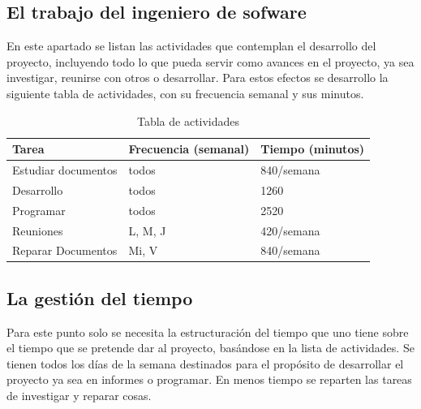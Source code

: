\documentclass[a4paper,12pt,openany,oneside]{book}
\begin{document}
\subsection{El trabajo del ingeniero de sofware}
En este apartado se listan las actividades que contemplan el desarrollo del proyecto, incluyendo todo lo que pueda servir como avances en el proyecto, ya sea investigar, reunirse con otros o desarrollar. Para estos efectos se desarrollo la siguiente tabla de actividades, con su frecuencia semanal y sus minutos.

\newpage
\begin{table}
\begin{tabular}{|l | l | l |}
\hline
\textbf{Tarea} & \textbf{Frecuencia (semanal)} & \textbf{Tiempo (minutos)} \\
\hline
Estudiar documentos & todos & 840/semana\\
\hline
Desarrollo & todos & 1260\\
\hline
Programar & todos & 2520\\
\hline
Reuniones & L, M, J & 420/semana\\
\hline
Reparar Documentos & Mi, V & 840/semana\\
\hline
\end{tabular}
\caption{Tabla de actividades}
\end{table}
\subsection{La gestión del tiempo}
Para este punto solo se necesita la estructuración del tiempo que uno tiene sobre el tiempo que se pretende dar al proyecto, basándose en la lista de actividades. Se tienen todos los días de la semana destinados para el propósito de desarrollar el proyecto ya sea en informes o programar. En menos tiempo se reparten las tareas de investigar y reparar cosas.
\end{document}
